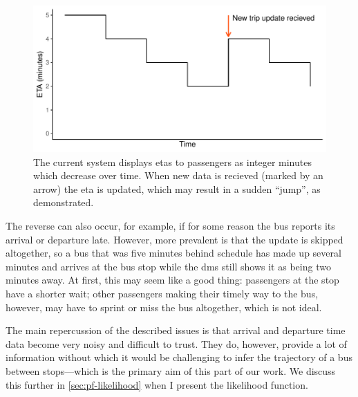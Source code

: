 \begin{knitrout}\small
{}\color{fgcolor}\begin{figure}

{\centering \includegraphics[width=.8\textwidth]{figure/tu_eta_jump-1} 

}

\caption[ETAs as percieved by passengers under the current system]{The current system displays \glspl{eta} to passengers as integer minutes which decrease over time. When new data is recieved (marked by an arrow) the \gls{eta} is updated, which may result in a sudden ``jump'', as demonstrated.}\label{fig:tu_eta_jump}
\end{figure}


\end{knitrout}


The reverse can also occur, for example, if for some reason the bus reports its arrival or departure late. However, more prevalent is that the update is skipped altogether, so a bus that was five minutes behind schedule has made up several minutes and arrives at the bus stop while the \gls{dms} still shows it as being two minutes away. At first, this may seem like a good thing: passengers at the stop have a shorter wait; other passengers making their timely way to the bus, however, may have to sprint or miss the bus altogether, which is not ideal.


The main repercussion of the described issues is that arrival and departure time data become very noisy and difficult to trust. They do, however, provide a lot of information without which it would be challenging to infer the trajectory of a bus between stops---which is the primary aim of this part of our work. We discuss this further in \cref{sec:pf-likelihood} when I present the likelihood function.
